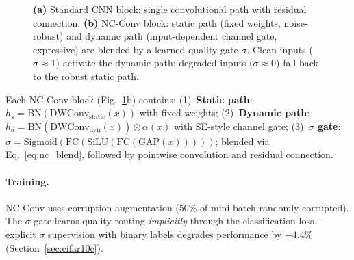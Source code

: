 \documentclass[10pt,twocolumn,letterpaper]{article}
\begin{document}
\begin{figure}[t]
\caption{\textbf{(a)} Standard CNN block: single convolutional path with residual connection. \textbf{(b)} NC-Conv block: \textcolor{fixcolor}{static path} (fixed weights, noise-robust) and \textcolor{dyncolor}{dynamic path} (input-dependent channel gate, expressive) are blended by a learned quality gate $\sigma$. Clean inputs ($\sigma{\approx}1$) activate the dynamic path; degraded inputs ($\sigma{\approx}0$) fall back to the robust static path.}
\label{fig:ncconv}
\end{figure}

Each NC-Conv block (Fig.~\ref{fig:ncconv}b) contains:
(1)~\textbf{Static path}: $h_s = \text{BN}(\text{DWConv}_{\text{static}}(x))$ with fixed weights;
(2)~\textbf{Dynamic path}: $h_d = \text{BN}(\text{DWConv}_{\text{dyn}}(x)) \odot \alpha(x)$ with SE-style channel gate;
(3)~\textbf{$\sigma$ gate}: $\sigma = \text{Sigmoid}(\text{FC}(\text{SiLU}(\text{FC}(\text{GAP}(x)))))$;
blended via Eq.~\ref{eq:nc_blend}, followed by pointwise convolution and residual connection.

\paragraph{Training.}
NC-Conv uses corruption augmentation (50\% of mini-batch randomly corrupted).
The $\sigma$ gate learns quality routing \emph{implicitly} through the classification loss---explicit $\sigma$ supervision with binary labels degrades performance by $-4.4\%$ (Section~\ref{sec:cifar10c}).
\end{document}
